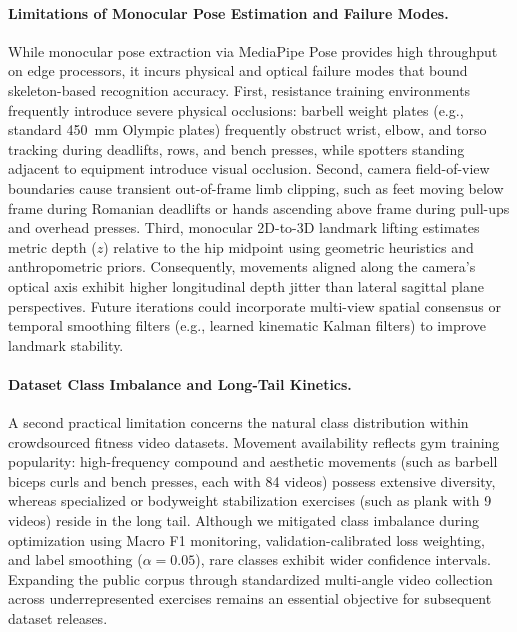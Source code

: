 \documentclass[preprint,12pt]{elsarticle}
\begin{document}
\paragraph{Limitations of Monocular Pose Estimation and Failure Modes.}
While monocular pose extraction via MediaPipe Pose provides high throughput on edge processors, it incurs physical and optical failure modes that bound skeleton-based recognition accuracy. First, resistance training environments frequently introduce severe physical occlusions: barbell weight plates (e.g., standard 450~mm Olympic plates) frequently obstruct wrist, elbow, and torso tracking during deadlifts, rows, and bench presses, while spotters standing adjacent to equipment introduce visual occlusion. Second, camera field-of-view boundaries cause transient out-of-frame limb clipping, such as feet moving below frame during Romanian deadlifts or hands ascending above frame during pull-ups and overhead presses. Third, monocular 2D-to-3D landmark lifting estimates metric depth ($z$) relative to the hip midpoint using geometric heuristics and anthropometric priors. Consequently, movements aligned along the camera's optical axis exhibit higher longitudinal depth jitter than lateral sagittal plane perspectives. Future iterations could incorporate multi-view spatial consensus or temporal smoothing filters (e.g., learned kinematic Kalman filters) to improve landmark stability.

\paragraph{Dataset Class Imbalance and Long-Tail Kinetics.}
A second practical limitation concerns the natural class distribution within crowdsourced fitness video datasets. Movement availability reflects gym training popularity: high-frequency compound and aesthetic movements (such as barbell biceps curls and bench presses, each with 84 videos) possess extensive diversity, whereas specialized or bodyweight stabilization exercises (such as plank with 9 videos) reside in the long tail. Although we mitigated class imbalance during optimization using Macro F1 monitoring, validation-calibrated loss weighting, and label smoothing ($\alpha=0.05$), rare classes exhibit wider confidence intervals. Expanding the public corpus through standardized multi-angle video collection across underrepresented exercises remains an essential objective for subsequent dataset releases.
\end{document}
